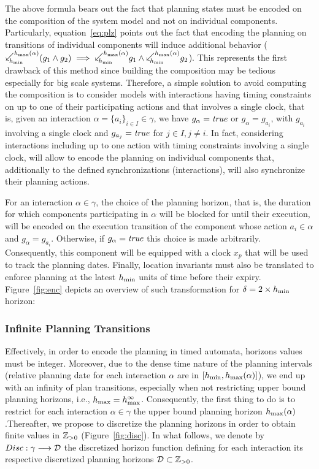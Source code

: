 The above formula bears out the fact that planning states must be encoded on the composition
of the system model and not on individual components. Particularly, equation~\ref{eq:plz}
points out the fact that encoding the planning on transitions of individual components
will induce additional behavior ($\backwardp{\hmin}{\hmx}(g_1\wedge g_2) \implies
\backwardp{\hmin}{\hmx} g_1\wedge\backwardp{\hmin}{\hmx}g_2$). This represents the first 
drawback of
this method since building the composition may be tedious especially for big scale systems.
Therefore, a simple solution to avoid computing the composition is to consider
models with interactions having timing constraints on up to one of their participating
actions and that involves a single clock, that is, given an interaction 
$\alpha=\{a_i\}_{i\in I}\in\gamma$, we have $g_{\alpha}=\textnormal{\textit{true}}$ or $g_{\alpha}=g_{a_i}$, with 
$g_{a_i}$ involving a single clock and $g_{a_j}=\textnormal{\textit{true}}$ for $j\in I, j\neq i$.
In fact, considering interactions including up to one action with timing constraints involving 
a single clock, 
will allow to encode the planning on individual components that, additionally to the defined 
synchronizations (interactions), will also synchronize their planning actions. 

For an interaction $\alpha\in\gamma$, the choice
of the planning horizon, that is, the duration for which components participating in $\alpha$ 
will be blocked for until their execution, will be encoded on the execution transition of 
the component whose action $a_i\in\alpha$ and $g_{\alpha}=g_{a_i}$. Otherwise,
if $g_{\alpha}=\textnormal{\textit{true}}$ this choice is made arbitrarily. Consequently, this component will be 
equipped with a clock $x_p$ that will be used to track the planning dates. 
Finally, location invariants must also be translated to enforce planning
at the latest $h_{\min}$ units of time before their expiry.
Figure~\ref{fig:enc} depicts an overview of such transformation for 
$\delta=2\times h_{\min}$ horizon: 


\subsubsection{Infinite Planning Transitions} 

Effectively, in order to encode the planning in timed automata, horizons values must
be integer. Moreover, due to the dense time nature of the planning intervals (relative 
planning date for each interaction $\alpha$ are in $[h_{\min},h_{\max}(\alpha)]$), we end up with 
an infinity of plan transitions, especially when not restricting upper bound planning horizons, 
i.e., $h_{\max}=h_{\max}^{\infty}$.
Consequently, the first thing to do is to restrict for each interaction $\alpha\in\gamma$ the
upper bound planning horizon $h_{\max}(\alpha)$.Thereafter, we propose to discretize the 
planning horizons in order to obtain finite values in $\mathbb{Z}_{> 0}$ (Figure~\ref{fig:disc}). 
In what follows, we denote by $Disc:\gamma\longrightarrow\mathcal{D}$ the discretized horizon function 
defining for each interaction its respective discretized planning horizons 
$\mathcal{D}\subset\mathbb{Z}_{> 0}$.

